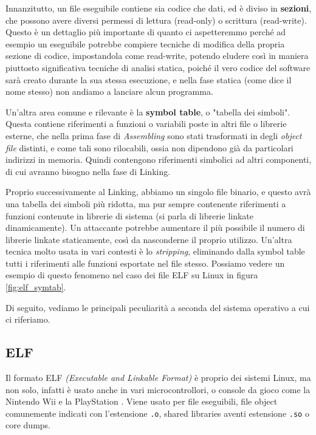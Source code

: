 Innanzitutto, un file eseguibile contiene sia codice che dati, ed è diviso in \textbf{sezioni}, che possono avere diversi permessi di lettura (read-only) o scrittura (read-write).
Questo è un dettaglio più importante di quanto ci aspetteremmo perché ad esempio un eseguibile potrebbe compiere tecniche di modifica della propria sezione di codice, impostandola come read-write, potendo eludere così in maniera piuttosto significativa tecniche di analisi statica, poiché il vero codice del software sarà creato durante la sua stessa esecuzione, e nella fase statica (come dice il nome stesso) non andiamo a lanciare alcun programma.

Un'altra area comune e rilevante è la \textbf{symbol table}, o "tabella dei simboli".
Questa contiene riferimenti a funzioni o variabili poste in altri file o librerie esterne, che nella prima fase di \emph{Assembling} sono stati trasformati in degli \emph{object file} distinti,
e come tali sono rilocabili, ossia non dipendono già da particolari indirizzi in memoria.
Quindi contengono riferimenti simbolici ad altri componenti, di cui avranno bisogno nella fase di Linking.

Proprio successivamente al Linking, abbiamo un singolo file binario, e questo avrà una tabella dei simboli più ridotta, ma pur sempre contenente riferimenti a funzioni contenute in librerie di sistema (si parla di librerie linkate dinamicamente).
Un attaccante potrebbe aumentare il più possibile il numero di librerie linkate staticamente, così da nasconderne il proprio utilizzo.
Un'altra tecnica molto usata in vari contesti è lo \emph{stripping}, eliminando dalla symbol table tutti i riferimenti alle funzioni esportate nel file stesso. Possiamo vedere un esempio di questo fenomeno nel caso dei file ELF su Linux in figura \ref{fig:elf_symtab}.

Di seguito, vediamo le principali peculiarità a seconda del sistema operativo a cui ci riferiamo.

\subsection{ELF}
Il formato ELF \emph{(Executable and Linkable Format)} è proprio dei sistemi Linux, ma non solo, infatti è usato anche in vari microcontrollori, o console da gioco come la Nintendo Wii e la PlayStation \cite{forensic_friday_execs}.
Viene usato per file eseguibili, file object comunemente indicati con l'estensione \texttt{.o}, shared libraries aventi estensione \texttt{.so} o core dumps.

